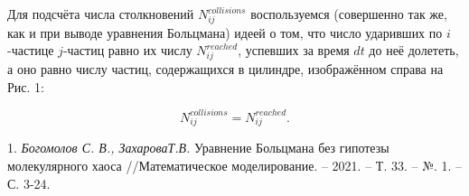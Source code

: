Для подсчёта числа столкновений $N_{ij}^{collisions}$  воспользуемся  (совершенно так же, как и при выводе уравнения Больцмана)
идеей о том, что число ударивших по $ i $-частице  $ j $-частиц равно их числу $N_{ij}^{reached}$, успевших за  время $ dt $ до неё долететь,
а оно равно числу частиц, содержащихся в  цилиндре, изображённом справа на Рис. 1: %

 \begin{equation}\label{Nreached}
 N_{ij}^{collisions} = N_{ij}^{reached}.
\end{equation}




\litlist

1. {\it Богомолов С. В., ЗахароваТ.В.}
 Уравнение Больцмана без гипотезы молекулярного хаоса //Математическое моделирование. – 2021. – Т. 33. – №. 1. – С. 3-24.
